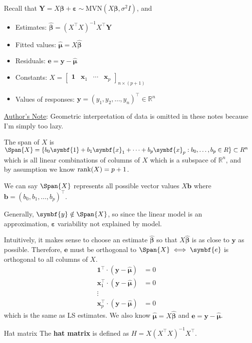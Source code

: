 Recall that $ \symbf{Y}=X\symbf{\beta}+\symbf{\varepsilon}
    \sim \text{MVN}(X\symbf{\beta},\sigma^2 I) $, and
\begin{itemize}
    \item Estimates: $ \hat{\symbf{\beta}}=(X^\top X)^{-1}X^\top \symbf{Y} $
    \item Fitted values: $ \hat{\symbf{\mu}}=X\hat{\symbf{\beta}} $
    \item Residuals: $ \symbf{e}=\symbf{y}-\hat{\symbf{\mu}} $
    \item Constants: $ X=\begin{bmatrix}
                  \symbf{1} & \symbf{x}_1 & \cdots & \symbf{x}_p
              \end{bmatrix}_{n\times(p+1)} $
    \item Values of responses: $
              \symbf{y}=(y_1,y_2,\ldots,y_n)^\top \in\mathbb{R}^n $
\end{itemize}
\underline{Author's Note}: Geometric interpretation of data is omitted in these notes because
I'm simply too lazy.

The span of $ X $ is $ \Span{X}=
    \set{b_0\symbf{1}+b_1\symbf{x}_1+\cdots+b_p\symbf{x}_p:b_0,\ldots,b_p\in\mathbb{R}}
    \subset \mathbb{R}^n $
which is all linear combinations of columns of $ X $ which is a subspace
of $ \mathbb{R}^n $, and by assumption we know $ \operatorname{rank}(X)=p+1 $.

We can say $ \Span{X} $ represents all possible vector
values $ X\symbf{b} $ where $ \symbf{b}=(b_0,b_1,\ldots,b_p)^\top $.

Generally, $ \symbf{y}\notin\Span{X} $, so since
the linear model is an approximation, $ \symbf{\varepsilon} $
variability not explained by model.

Intuitively, it makes sense to choose an estimate
$ \hat{\symbf{\beta}} $ so that $ X\hat{\symbf{\beta}} $
is as close to $ \symbf{y} $ as possible. Therefore,
$ \symbf{e} $ must be orthogonal to $ \Span{X}
    \iff \symbf{e} $ is orthogonal to all columns of $ X $.
\begin{align*}
    \symbf{1}^\top\cdot(\symbf{y}-\hat{\symbf{\mu}})   & =      0 \\
    \symbf{x}_1^\top\cdot(\symbf{y}-\hat{\symbf{\mu}}) & =      0 \\
    \vdots                                                        \\
    \symbf{x}_p^\top\cdot(\symbf{y}-\hat{\symbf{\mu}}) & =      0
\end{align*}
which is the same as LS estimates. We also know
$ \hat{\symbf{\mu}}=X\hat{\symbf{\beta}} $ and
$ \symbf{e}=\symbf{y}-\hat{\symbf{\mu}} $.
\begin{Definition}{Hat matrix}{}
    The \textbf{hat matrix} is defined as
    $ H=X(X^\top X)^{-1}X^{\top} $.
\end{Definition}

